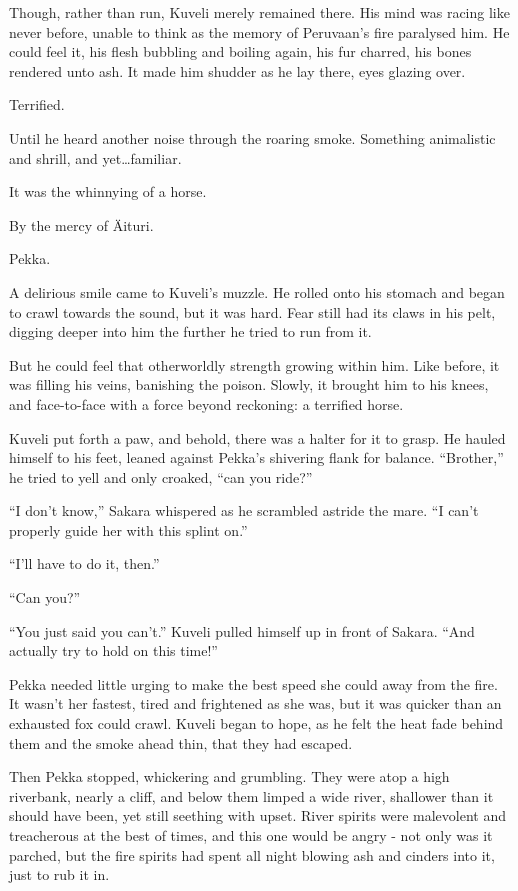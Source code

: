 Though, rather than run, Kuveli merely remained there. His mind was racing like never before, unable to think as the memory of Peruvaan's fire paralysed him. He could feel it, his flesh bubbling and boiling again, his fur charred, his bones rendered unto ash. It made him shudder as he lay there, eyes glazing over.

Terrified.

Until he heard another noise through the roaring smoke. Something animalistic and shrill, and yet\ldots{}familiar.

It was the whinnying of a horse.

By the mercy of Äituri.

Pekka.

A delirious smile came to Kuveli's muzzle. He rolled onto his stomach and began to crawl towards the sound, but it was hard. Fear still had its claws in his pelt, digging deeper into him the further he tried to run from it.

But he could feel that otherworldly strength growing within him. Like before, it was filling his veins, banishing the poison. Slowly, it brought him to his knees, and face-to-face with a force beyond reckoning: a terrified horse.

Kuveli put forth a paw, and behold, there was a halter for it to grasp. He hauled himself to his feet, leaned against Pekka's shivering flank for balance. ``Brother,'' he tried to yell and only croaked, ``can you ride?''

``I don't know,'' Sakara whispered as he scrambled astride the mare. ``I can't properly guide her with this splint on.''

``I'll have to do it, then.''

``Can you?''

``You just said you can't.'' Kuveli pulled himself up in front of Sakara. ``And actually try to hold on this time!''

Pekka needed little urging to make the best speed she could away from the fire. It wasn't her fastest, tired and frightened as she was, but it was quicker than an exhausted fox could crawl. Kuveli began to hope, as he felt the heat fade behind them and the smoke ahead thin, that they had escaped.

Then Pekka stopped, whickering and grumbling. They were atop a high riverbank, nearly a cliff, and below them limped a wide river, shallower than it should have been, yet still seething with upset. River spirits were malevolent and treacherous at the best of times, and this one would be angry - not only was it parched, but the fire spirits had spent all night blowing ash and cinders into it, just to rub it in.

